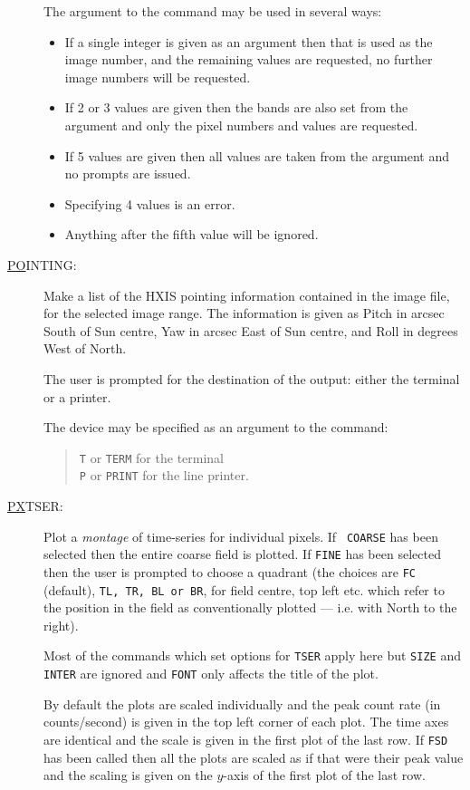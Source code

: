 \begin{description}
The argument to the command may be used in several ways:
\begin{itemize}
\item If a single integer is given as an argument then that is used as the image
number, and the remaining values are requested, no further image
numbers will be requested.
\item If 2 or 3 values are given then the bands are also set from the argument
and only the pixel numbers and values are requested.
\item If 5 values are given then all values are taken from the argument and no
prompts are issued.
\item Specifying 4 values is an error. 
\item Anything after the fifth value will be ignored.
\end{itemize}

\item[\underline{PO}INTING: ] \label{po}
Make a list of the HXIS pointing information contained in the image
file, for the selected image range. The information is given as Pitch
in arcsec South of Sun centre, Yaw in arcsec East of Sun centre, and
Roll in degrees West of North.

The user is prompted for the destination of the output: either the
terminal or a printer.

The device may be specified as an argument to the command:
\begin{quote}
{\tt T} or {\tt TERM} for the terminal\\ {\tt P} or {\tt PRINT} for the
line printer.
\end{quote}

\item[\underline{PX}TSER: ] \label{px}
Plot a {\em montage} of time-series for individual pixels. If {\tt
COARSE} has been selected then the entire coarse field is plotted. If
{\tt FINE} has been selected then the user is prompted to choose a
quadrant (the choices are {\tt FC} (default), {\tt TL, TR, BL {\rm or}
BR}, for field centre, top left etc. which refer to the position in the
field as conventionally plotted --- i.e. with North to the right).

Most of the commands which set options for {\tt TSER} apply here but
{\tt SIZE} and {\tt INTER} are ignored and {\tt FONT} only affects the
title of the plot.

By default the plots are scaled individually and the peak count rate
(in counts/second) is given in the top left corner of each plot. The
time axes are identical and the scale is given in the first plot of the
last row. If {\tt FSD} has been called then all the plots are scaled as
if that were their peak value and the scaling is given on the $y$-axis
of the first plot of the last row.


\end{description}
